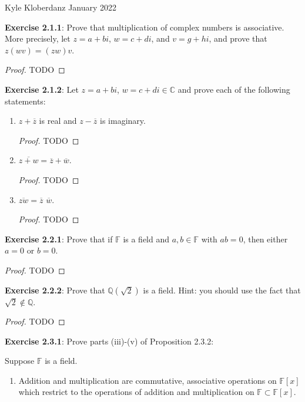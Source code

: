 \documentclass[a4paper]{article}
\begin{document}
\begin{myparindent}{0pt}

Kyle Kloberdanz  January 2022 \newline

\textbf{Exercise 2.1.1}:
Prove that multiplication of complex numbers is associative. More precisely,
let $z = a + bi$, $w = c + di$, and $v = g + hi$, and prove that
$z(wv) = (zw)v$.

\begin{proof}
TODO
\end{proof}

\textbf{Exercise 2.1.2}:
Let $z = a + bi$, $w = c + di \in \mathbb{C}$ and prove each of the following
statements:

\begin{enumerate}[label=(\roman*)]
  \item $z + \overline{z}$ is real and $z - \overline{z}$ is imaginary.
    \begin{proof}
    TODO
    \end{proof}
  \item $\overline{z + w} = \overline{z} + \overline{w}$.
    \begin{proof}
    TODO
    \end{proof}
  \item $\overline{zw} = \overline{z}$ $\overline{w}$.
    \begin{proof}
    TODO
    \end{proof}
\end{enumerate}

\textbf{Exercise 2.2.1}:
Prove that if $\mathbb{F}$ is a field and $a, b \in \mathbb{F}$ with $ab = 0$,
then either $a = 0$ or $b = 0$.

\begin{proof}
TODO
\end{proof}

\textbf{Exercise 2.2.2}:
Prove that $\mathbb{Q}(\sqrt{2})$ is a field. Hint: you should use the fact that
$\sqrt{2} \notin \mathbb{Q}$.

\begin{proof}
TODO
\end{proof}

\textbf{Exercise 2.3.1}:
Prove parts (iii)-(v) of Proposition 2.3.2:

Suppose $\mathbb{F}$ is a field.

\begin{enumerate}[label=(\roman*)]
  \item Addition and multiplication are commutative, associative operations on
  $\mathbb{F}[x]$ which restrict to the operations of addition and multiplication
  on $\mathbb{F} \subset \mathbb{F}[x]$.


\end{enumerate}
\end{myparindent}
\end{document}
